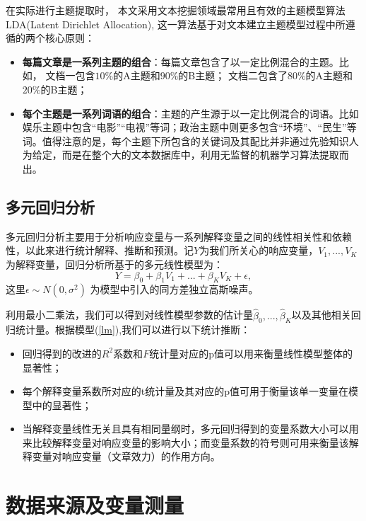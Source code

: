 \documentclass[a4paper,12pt,UTF8]{article}
\begin{document}
    在实际进行主题提取时， 本文采用文本挖掘领域最常用且有效的主题模型算法LDA(Latent Dirichlet Allocation), 这一算法基于对文本建立主题模型过程中所遵循的两个核心原则：
    
    \begin{itemize}
      \item \textbf{每篇文章是一系列主题的组合}：每篇文章包含了以一定比例混合的主题。比如， 文档一包含$10\%$的A主题和$90\%$的B主题； 文档二包含了$80\%$的A主题和$20\%$的B主题；
      \item \textbf{每个主题是一系列词语的组合}：主题的产生源于以一定比例混合的词语。比如
      娱乐主题中包含“电影”“电视”等词；政治主题中则更多包含“环境”、“民生”等词。值得注意的是，每个主题下所包含的关键词及其配比并非通过先验知识人为给定，而是在整个大的文本数据库中，利用无监督的机器学习算法提取而出。
    \end{itemize}
    
    \subsection{多元回归分析}
    多元回归分析主要用于分析响应变量与一系列解释变量之间的线性相关性和依赖性，以此来进行统计解释、推断和预测。记$Y$为我们所关心的响应变量，$V_1,...,V_K$为解释变量，回归分析所基于的多元线性模型为：
    \begin{equation}\label{lm}
      Y = \beta_0+ \beta_1 V_1+...+\beta_K V_K +\epsilon,
    \end{equation}
    这里$\epsilon \sim N(0,\sigma^2)$ 为模型中引入的同方差独立高斯噪声。
    
    利用最小二乘法，我们可以得到对线性模型参数的估计量$\hat\beta_0,...,\hat\beta_K$以及其他相关回归统计量。根据模型(\ref{lm}),我们可以进行以下统计推断：
    \begin{itemize}
      \item 回归得到的改进的$R^2$系数和$F$统计量对应的p值可以用来衡量线性模型整体的显著性；
      \item 每个解释变量系数所对应的t统计量及其对应的p值可用于衡量该单一变量在模型中的显著性；
      \item 当解释变量线性无关且具有相同量纲时，多元回归得到的变量系数大小可以用来比较解释变量对响应变量的影响大小；而变量系数的符号则可用来衡量该解释变量对响应变量（文章效力）的作用方向。
    \end{itemize}
    \section{数据来源及变量测量}
\end{document}
